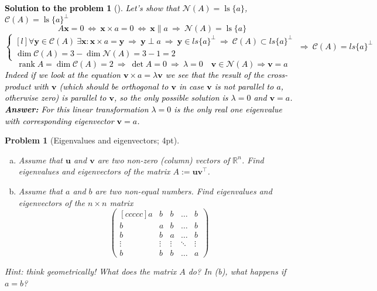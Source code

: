 \documentclass[12pt,a4]{article}
\newtheorem{problem}{Problem}
\newtheorem{solution}{Solution to the problem}
\newcommand\rank{\operatorname{rank}}
\newcommand\ls{\operatorname{ls}}
\newcommand{\norm}[1]{\left\lVert#1\right\rVert}
\newcommand{\bu}{{\mathbf u}}
\newcommand{\bv}{{\mathbf v}}
\newcommand{\bx}{{\mathbf x}}
\newcommand{\by}{{\mathbf y}}
\renewcommand{\Im}{{\mathcal C}}
\newcommand{\Ker}{{\mathcal N}}
\newcommand{\answer}[1]{\textbf{Answer:} #1}
\begin{document}
\textcolor{black}{
\begin{solution}[]\rm Let's show that $\Ker(A) = \ls \{a\}$, $\Im(A) =\ls \{a\}^\perp$
\[
A\bx = 0
~ \Leftrightarrow ~
\bx \times a = 0
~ \Leftrightarrow ~
\bx \parallel a
~ \Rightarrow ~
\Ker(A) =  \ls \{a\}
\]
\[
\left \{ \begin{matrix}[l]
\forall \by \in \Im(A) ~ \exists \bx: \bx \times a = \by 
~ \Rightarrow ~
\by \perp a
~ \Rightarrow ~
\by \in ls\{a\}^\perp 
~ \Rightarrow ~
\Im(A) \subset ls\{a\}^\perp
\\
\dim \Im(A) = 3 - \dim \Ker(A) = 3 - 1 = 2
\end{matrix} \right.
~ \Rightarrow ~
\Im(A) = ls\{a\}^\perp
\]
\[
\rank A = \dim \Im(A) = 2
~ \Rightarrow ~
\det A = 0
~ \Rightarrow ~
\lambda = 0
\quad
\bv \in \Ker(A) \Rightarrow \bv = a
\]
Indeed if we look at the equation
$ \bv \times a = \lambda \bv $ we see that the result of the cross-product  with $\bv$ (which should be orthogonal to $\bv$ in case $\bv$ is not parallel to $a$, otherwise zero) is parallel to $\bv$, so the only possible solution is $\lambda = 0$ and $\bv = a$.\\
\answer{
For this linear transformation $\lambda = 0$ is the only real one eigenvalue with corresponding eigenvector $\bv = a$.
}
\end{solution}
}


\begin{problem}[Eigenvalues and eigenvectors; 4pt]\rm
	\begin{enumerate}[(a)]
		\item Assume that $\bu$ and $\bv$ are two non-zero (column) vectors of $\mathbb{R}^n$. Find eigenvalues and eigenvectors of the matrix $A:= \bu\bv^\top$.
		\item Assume that $a$ and $b$ are two non-equal numbers. Find eigenvalues and eigenvectors of the $n\times n$ matrix
		\[
			\begin{pmatrix}[ccccc]
				a & b & b & \dots & b\\ b & a & b & \dots & b \\ b & b & a & \dots & b \\
				\vdots & \vdots & \vdots & \ddots & \vdots \\ b & b & b & \dots & a
			\end{pmatrix}
		\]
	\end{enumerate}

{\small{\textsf{Hint: think geometrically! What does the matrix $A$ do? In (b), what happens if $a=b$?}}}
\end{problem}
\end{document}
